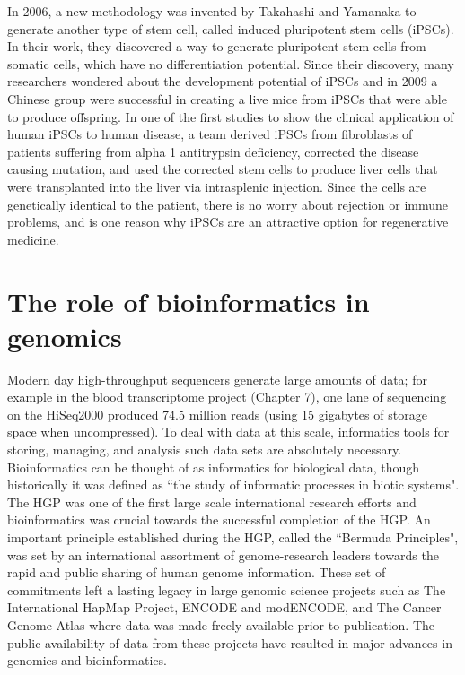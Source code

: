 In 2006, a new methodology was invented by Takahashi and Yamanaka to generate another type of stem cell, called induced pluripotent stem cells (iPSCs)\cite{pmid16904174}. In their work, they discovered a way to generate pluripotent stem cells from somatic cells, which have no differentiation potential. Since their discovery, many researchers wondered about the development potential of iPSCs and in 2009 a Chinese group were successful in creating a live mice from iPSCs that were able to produce offspring\cite{pmid19672241}. In one of the first studies to show the clinical application of human iPSCs to human disease, a team derived iPSCs from fibroblasts of patients suffering from alpha 1 antitrypsin deficiency, corrected the disease causing mutation, and used the corrected stem cells to produce liver cells that were transplanted into the liver via intrasplenic injection\cite{pmid21993621}. Since the cells are genetically identical to the patient, there is no worry about rejection or immune problems, and is one reason why iPSCs are an attractive option for regenerative medicine.

\section{The role of bioinformatics in genomics}

Modern day high-throughput sequencers generate large amounts of data; for example in the blood transcriptome project (Chapter 7), one lane of sequencing on the HiSeq2000 produced 74.5 million reads (using 15 gigabytes of storage space when uncompressed). To deal with data at this scale, informatics tools for storing, managing, and analysis such data sets are absolutely necessary. Bioinformatics can be thought of as informatics for biological data, though historically it was defined as ``the study of informatic processes in biotic systems"\cite{pmid21483479}. The HGP was one of the first large scale international research efforts and bioinformatics was crucial towards the successful completion of the HGP\cite{stein1996perl}. An important principle established during the HGP, called the ``Bermuda Principles", was set by an international assortment of genome-research leaders towards the rapid and public sharing of human genome information. These set of commitments left a lasting legacy in large genomic science projects such as The International HapMap Project, ENCODE and modENCODE, and The Cancer Genome Atlas where data was made freely available prior to publication\cite{contreras2011bermuda}. The public availability of data from these projects have resulted in major advances in genomics and bioinformatics.

